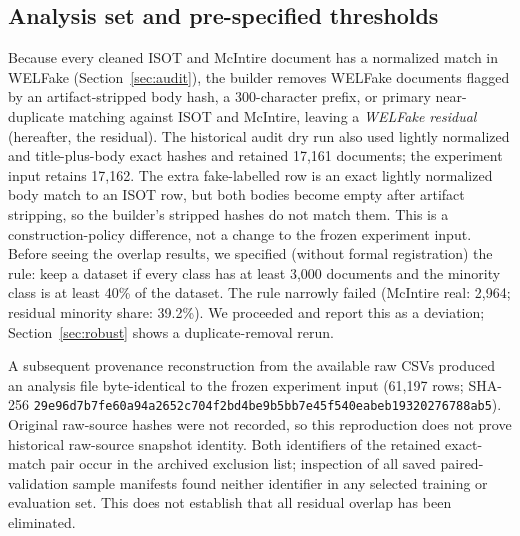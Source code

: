 \subsection{Analysis set and pre-specified thresholds}
Because every cleaned ISOT and McIntire document has a normalized match in WELFake (Section~\ref{sec:audit}), the builder removes WELFake documents flagged by an artifact-stripped body hash, a 300-character prefix, or primary near-duplicate matching against ISOT and McIntire, leaving a \emph{WELFake residual} (hereafter, the residual). The historical audit dry run also used lightly normalized and title-plus-body exact hashes and retained 17,161 documents; the experiment input retains 17,162. The extra fake-labelled row is an exact lightly normalized body match to an ISOT row, but both bodies become empty after artifact stripping, so the builder's stripped hashes do not match them. This is a construction-policy difference, not a change to the frozen experiment input. Before seeing the overlap results, we specified (without formal registration) the rule: keep a dataset if every class has at least 3,000 documents and the minority class is at least 40\% of the dataset. The rule narrowly failed (McIntire real: 2,964; residual minority share: 39.2\%). We proceeded and report this as a deviation; Section~\ref{sec:robust} shows a duplicate-removal rerun.

A subsequent provenance reconstruction from the available raw CSVs produced an analysis file byte-identical to the frozen experiment input (61,197 rows; SHA-256 \texttt{29e96d7b7fe60a94}\allowbreak\texttt{a2652c704f2bd4be}\allowbreak\texttt{9b5bb7e45f540eab}\allowbreak\texttt{eb19320276788ab5}). Original raw-source hashes were not recorded, so this reproduction does not prove historical raw-source snapshot identity. Both identifiers of the retained exact-match pair occur in the archived exclusion list; inspection of all saved paired-validation sample manifests found neither identifier in any selected training or evaluation set. This does not establish that all residual overlap has been eliminated.


